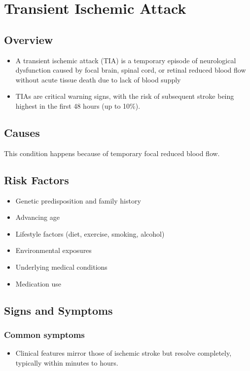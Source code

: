 \chapter{Transient Ischemic Attack}
\label{sec:Transient Ischemic Attack}

\section{Overview}


\begin{itemize}[noitemsep]
  \item A transient ischemic attack (TIA) is a temporary episode of neurological dysfunction caused by focal brain, spinal cord, or retinal reduced blood flow without acute tissue death due to lack of blood supply
  \item TIAs are critical warning signs, with the risk of subsequent stroke being highest in the first 48 hours (up to 10\%).
\end{itemize}
\section{Causes}
This condition happens because of temporary focal reduced blood flow.     
\section{Risk Factors}

\begin{itemize}[noitemsep]
  \item Genetic predisposition and family history
  \item Advancing age
  \item Lifestyle factors (diet, exercise, smoking, alcohol)
  \item Environmental exposures
  \item Underlying medical conditions
  \item Medication use
\end{itemize}
\section{Signs and Symptoms}

\subsection{Common symptoms}
\begin{itemize}[noitemsep]
  \item Clinical features mirror those of ischemic stroke but resolve completely, typically within minutes to hours. 
  \end{itemize}

